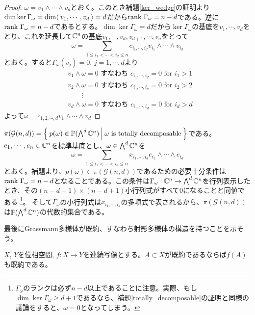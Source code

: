 \documentclass{ltjsreport}
\begin{document}
\begin{proof}
  $\omega=v_1\wedge\cdots\wedge v_d$とおく。このとき補題\ref{ker_wedge}の証明より$\dim\ker\Gamma_\omega=\dim \langle\:v_1,\cdots,v_d\:\rangle=d$だから$\text{rank }\Gamma_\omega=n-d$である。逆に$\text{rank }\Gamma_\omega=n-d$であるとする。$\dim\ker\Gamma_\omega=d$だから$\ker\Gamma_\omega$の基底を$v_1,\cdots,v_d$をとり、これを延長して$\mathbb{C}^n$の基底$v_1,\cdots,v_d,v_{d+1},\cdots,v_n$をとって
  \[
  \omega=\sum_{1\leq i_1<\cdots<i_d\leq n}c_{i_1,\cdots,i_d}v_{i_1}\wedge\cdots\wedge v_{i_d}  
  \]
  とおく。すると$\Gamma_\omega(v_j)=0$, $j=1,\cdots,d$より
  \begin{align*}
    &v_1\wedge\omega=0\text{ すなわち } c_{i_1,\cdots,i_d}=0\text{ for } i_1 > 1\\
    &v_2\wedge\omega=0\text{ すなわち } c_{i_1,\cdots,i_d}=0\text{ for }i_2 > 2\\
    &\qquad\vdots\\
    &v_d\wedge\omega=0\text{ すなわち } c_{i_1,\cdots,i_d}=0\text{ for }i_d > d
  \end{align*}
  よって$\omega=c_{1,2,\cdots,d}v_1\wedge\cdots\wedge v_d$
\end{proof}



$\pi(\mathcal{G}(n,d))=\left\{\:p(\omega)\in\mathbb{P}(\bigwedge^d\mathbb{C}^n)\:\middle|\:\omega\text{ is totally decomposable}\:\right\}$である。$e_1,\cdots,e_n\in \mathbb{C}^n$を標準基底とし、$\omega\in\bigwedge^d\mathbb{C}^n$を
\[
\omega=\sum_{1\leq i_1<\cdots<i_d\leq n}x_{i_1,\cdots,i_d}e_{i_1}\wedge\cdots\wedge e_{i_d}  
\]
とおく。補題より、$p(\omega)\in\pi(\mathcal{G}(n,d))$であるための必要十分条件は$\text{rank }\Gamma_\omega=n-d$となることである。この条件は$\Gamma_\omega:\mathbb{C}^n\rightarrow \bigwedge^d\mathbb{C}^n$を行列表示したとき、その$(n-d+1)\times(n-d+1)$小行列式がすべて$0$になることと同値である
\footnote{
  $\Gamma_\omega$のランクは必ず$n-d$以上であることに注意。実際、もし$\dim\ker\Gamma_{\omega}\geq d+1$であるなら、補題\ref{totally_decomposable}の証明と同様の議論をすると、$\omega=0$となってしまう。
}。
そして$\Gamma_\omega$の小行列式は$x_{i_1,\cdots,i_d}$の多項式で表されるから、$\pi(\mathcal{G}(n,d))$は$\mathbb{P}({\bigwedge^d\mathbb{C}^n})$の代数的集合である。


最後にGrassmann多様体が既約、すなわち射影多様体の構造を持つことを示そう。

\begin{lemm}\label{image_of_irrspace}
  $X$, $Y$を位相空間, $f:X\rightarrow Y$を連続写像とする。$A\subset X$が既約であるならば$f(A)$も既約である。
\end{lemm}
\end{document}
